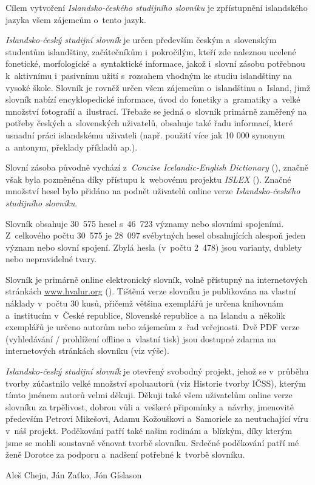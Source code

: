 Cílem vytvoření\textit{ Islandsko-českého studijního slovníku} je zpřístupnění islandského jazyka všem zájemcům o~tento jazyk. 

\textit{Islandsko-český studijní slovník} je určen především českým a~slovenským studentům islandštiny, začátečníkům i~pokročilým, kteří zde naleznou ucelené fonetické, morfologické a~syntaktické informace, jakož
i~slovní zásobu potřebnou k~aktivnímu i~pasivnímu užití s~rozsahem vhodným ke studiu islandštiny na vysoké škole.
Slovník je rovněž určen všem zájemcům o~islandštinu a~Island, jimž slovník nabízí encyklopedické informace, úvod do fonetiky a~gramatiky a~velké množství fotografií a~ilustrací. 
Třebaže se jedná o~slovník primárně zaměřený na potřeby českých a~slovenských uživatelů, obsahuje také řadu informací, které usnadní práci islandskému uživateli (např. použití více jak 10 000 synonym a~antonym, překlady příkladů ap.).

Slovní zásoba původně vychází z~\textit{Concise Icelandic-English Dictionary} (\cite {ic_en}), značně však byla pozměněna díky přístupu k~webovému projektu \textit{ISLEX} (\cite {int1}). Značné množství hesel bylo
přidáno na podnět uživatelů online verze \textit{Islandsko-českého studijního slovníku}.

Slovník obsahuje 30~575 hesel s~46~723 významy nebo slovními spojeními. Z~celkového počtu 30~575 je 28~097 svébytných hesel obsahujících alespoň jeden význam nebo slovní spojení. 
Zbylá hesla (v~počtu 2~478) jsou varianty, dublety nebo nepravidelné tvary.

Slovník je primárně online elektronický slovník, volně přístupný na internetových stránkách \url{www.hvalur.org}  (\cite {int14}). 
Tištěná verze slovníku je publikována na vlastní náklady v~počtu 30 kusů, přičemž většina exemplářů je určena knihovnám a~institucím v~České republice, Slovenské republice a~na Islandu
a~několik exemplářů je určeno autorům nebo zájemcům z~řad veřejnosti. Dvě PDF verze (vyhledávání / prohlížení offline a~vlastní tisk) jsou dostupné zdarma na internetových stránkách slovníku (viz výše).

\textit{Islandsko-český studijní slovník} je otevřený svobodný projekt, jehož se v~průběhu tvorby zúčastnilo velké množství spoluautorů (viz Historie tvorby IČSS), kterým tímto jménem autorů velmi děkuji.
Děkuji také všem uživatelům online verze slovníku za trpělivost, dobrou vůli a~veškeré připomínky a~návrhy, jmenovitě především Petrovi Mikešovi, Adamu Kožouškovi a~Samoriele za neutuchající víru v~náš projekt.
Poděkování patří také našim rodinám a~blízkým, díky kterým jsme se mohli soustavně věnovat tvorbě slovníku.
Srdečné poděkování patří mé ženě Dorotce za podporu a~nadšení potřebné k~tvorbě slovníku.

\blspace[5]

{\centering Aleš Chejn, Ján Zaťko, Jón Gíslason\par}
